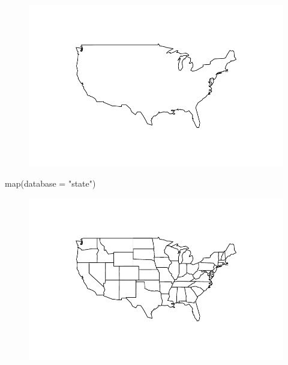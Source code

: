 \documentclass[
  letterpaper,
  DIV=11,
  numbers=noendperiod]{scrreprt}
\newenvironment{Shaded}{\begin{snugshade}}{\end{snugshade}}
\newcommand{\AttributeTok}[1]{\textcolor[rgb]{0.40,0.45,0.13}{#1}}
\newcommand{\FunctionTok}[1]{\textcolor[rgb]{0.28,0.35,0.67}{#1}}
\newcommand{\NormalTok}[1]{\textcolor[rgb]{0.00,0.23,0.31}{#1}}
\newcommand{\StringTok}[1]{\textcolor[rgb]{0.13,0.47,0.30}{#1}}
\begin{document}
\begin{figure}[H]

{\centering \includegraphics{12-Maps_files/figure-pdf/unnamed-chunk-4-1.pdf}

}

\end{figure}

\begin{Shaded}
\begin{Highlighting}[]
\FunctionTok{map}\NormalTok{(}\AttributeTok{database =} \StringTok{"state"}\NormalTok{)}
\end{Highlighting}
\end{Shaded}

\begin{figure}[H]

{\centering \includegraphics{12-Maps_files/figure-pdf/unnamed-chunk-5-1.pdf}

}

\end{figure}
\end{document}
